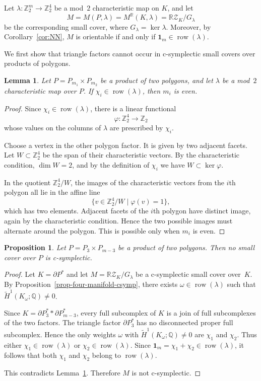 \documentclass{amsart}
\newtheorem{lemma}[theorem]{Lemma}
\newtheorem{proposition}[theorem]{Proposition}
\numberwithin{equation}{section}
\theoremstyle{definition}
\theoremstyle{remark}
\newcommand{\Z}{\mathbb Z}
\newcommand{\R}{\mathbb R}
\newcommand{\Q}{\mathbb Q}
\newcommand{\RZ}{\mathbb R\mathcal Z}
\newcommand{\one}{\mathbf 1}
\DeclareMathOperator{\join}{\ast}
\DeclareMathOperator{\row}{row}
\begin{document}
Let $\lambda\colon \Z_2^m\to \Z_2^4$ be a mod~$2$ characteristic map on $K$, and let 
$$
    M=M(P,\lambda)=M^\R(K,\lambda) = \RZ_K/G_\lambda
$$
be the corresponding small cover, where $G_\lambda = \ker\lambda$.
Moreover, by Corollary~\ref{cor:NN}, $M$ is orientable if and only if $\one_m \in \row(\lambda)$.

We first show that triangle factors cannot occur in c-symplectic small covers over products of polygons.
\begin{lemma}\label{lem:odd-factor-not-compatible}
    Let $P = P_{m_1} \times P_{m_2}$ be a product of two polygons, and let $\lambda$ be a mod~$2$ characteristic map over $P$.
    If  $\chi_i \in \row(\lambda)$, then $m_i$ is even.
\end{lemma}
\begin{proof}
    Since $\chi_i \in \row(\lambda)$, there is a linear functional
    $$
        \varphi\colon \Z_2^{4}\to \Z_2
    $$
    whose values on the columns of $\lambda$ are prescribed by $\chi_i$.
    
    Choose a vertex in the other polygon factor.
    It is given by two adjacent facets.
    Let $W \subset \Z_2^{4}$ be the span of their characteristic vectors.
    By the characteristic condition, $\dim W=2$, and by the definition of $\chi_i$ we have $W\subset \ker\varphi$.
    
    In the quotient $\Z_2^{4}/W$, the images of the characteristic vectors from the $i$th polygon all lie in the affine line
    $$
        \{v\in \Z_2^{4}/W\mid \varphi(v)=1\},
    $$
    which has two elements.
    Adjacent facets of the $i$th polygon have distinct image, again by the characteristic condition.
    Hence the two possible images must alternate around the polygon.
    This is possible only when $m_i$ is even.
\end{proof}

\begin{proposition}\label{prop:triangle-factor-not-csymp}
    Let $P = P_{3} \times P_{m-3}$ be a product of two polygons.
    Then no small cover over $P$ is c-symplectic.
\end{proposition}
\begin{proof}
    Let $K=\partial P^\ast$ and let $M=\RZ_K/G_\lambda$ be a c-symplectic small cover over~$K$.
    By Proposition~\ref{prop-four-manifold-csymp}, there exists $\omega \in \row(\lambda)$ such that $\widetilde{H}^1( K_\omega;\Q) \neq 0$.
    
    Since $K=\partial P_3^\ast\join \partial P_{m-3}^\ast$, every full subcomplex of $K$ is a join of full subcomplexes of the two factors.
    The triangle factor $\partial P_3^\ast$ has no disconnected proper full subcomplex. Hence the only weights $\omega$ with $\widetilde H^1(K_\omega;\Q)\ne0$ are $\chi_1$ and $\chi_2$.
    Thus either $\chi_1\in\row(\lambda)$ or $\chi_2\in\row(\lambda)$.
    Since $\one_m=\chi_1+\chi_2\in\row(\lambda)$, it follows that both $\chi_1$ and $\chi_2$ belong to $\row(\lambda)$.
    
    This contradicts Lemma~\ref{lem:odd-factor-not-compatible}.
    Therefore $M$ is not c-symplectic.
\end{proof}
\end{document}
